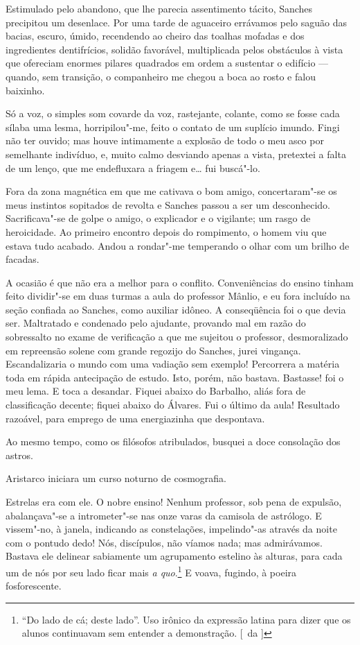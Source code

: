 Estimulado pelo abandono, que lhe parecia
assentimento tácito, Sanches precipitou um desenlace. Por uma tarde de
aguaceiro errávamos pelo saguão das bacias, escuro, úmido, recendendo
ao cheiro das toalhas mofadas e dos ingredientes dentifrícios, solidão
favorável, multiplicada pelos obstáculos à vista que ofereciam enormes
pilares quadrados em ordem a sustentar o edifício --- quando, sem
transição, o companheiro me chegou a boca ao rosto e falou baixinho. 

Só a voz, o simples som covarde da voz, rastejante, colante, como se fosse
cada sílaba uma lesma, horripilou"-me, feito o contato de um suplício
imundo. Fingi não ter ouvido; mas houve intimamente a explosão de todo
o meu asco por semelhante indivíduo, e, muito calmo desviando apenas a
vista, pretextei a falta de um lenço, que me endefluxara a friagem e\ldots{}
fui buscá"-lo. 

Fora da zona magnética em que me cativava o bom amigo,
concertaram"-se os meus instintos sopitados de revolta e Sanches
passou a ser um desconhecido. Sacrificava"-se de golpe o amigo, o
explicador e o vigilante; um rasgo de heroicidade. Ao primeiro encontro
depois do rompimento, o homem viu que estava tudo acabado. Andou a
rondar"-me temperando o olhar com um brilho de facadas. 

A ocasião é que não era a melhor para o conflito. Conveniências do ensino tinham
feito dividir"-se em duas turmas a aula do professor Mânlio, e eu fora
incluído na seção confiada ao Sanches, como auxiliar idôneo. A
conseqüência foi o que devia ser. Maltratado e condenado pelo ajudante,
provando mal em razão do sobressalto no exame de verificação a que me
sujeitou o professor, desmoralizado em repreensão solene com grande
regozijo do Sanches, jurei vingança. Escandalizaria o mundo com uma
vadiação sem exemplo! Percorrera a matéria toda em rápida antecipação
de estudo. Isto, porém, não bastava. Bastasse! foi o meu lema. E toca a
desandar. Fiquei abaixo do Barbalho, aliás fora de classificação
decente; fiquei abaixo do Álvares. Fui o último da aula! Resultado
razoável, para emprego de uma energiazinha que despontava. 

Ao mesmo tempo, como os filósofos atribulados, 
busquei a doce consolação dos astros. 

Aristarco iniciara um curso noturno de cosmografia. 

Estrelas era com ele. O nobre ensino! Nenhum professor, sob pena de expulsão,
abalançava"-se a intrometer"-se nas onze varas da camisola de
astrólogo. E vissem"-no, à janela, indicando as constelações,
impelindo"-as através da noite com o pontudo dedo! Nós, discípulos,
não víamos nada; mas admirávamos. Bastava ele delinear sabiamente um
agrupamento estelino às alturas, para cada um de nós por seu lado ficar
mais \textit{a quo}.\footnote{ ``Do lado de cá; deste lado''. Uso irônico 
da expressão latina para dizer que os alunos continuavam sem entender 
a demonstração. [~da ]} E voava, fugindo, à poeira fosforescente. 

